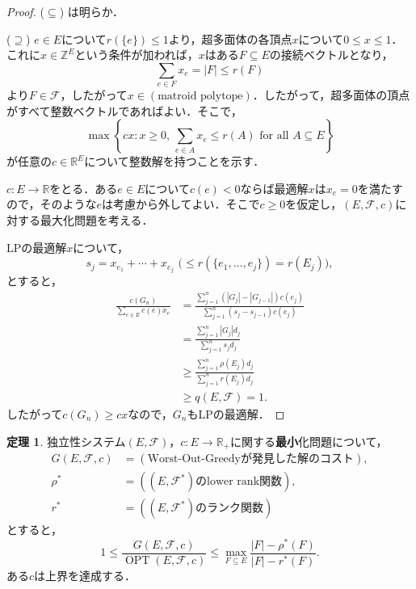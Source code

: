 \documentclass[xelatex,ja=standard,a4paper,14pt,everyparhook=compat]{bxjsarticle}
\newcommand{\bbZ}{\mathbb{Z}}
\newcommand{\bbR}{\mathbb{R}}
\newcommand{\mcF}{\mathcal{F}}
\DeclareMathOperator{\OPT}{OPT}
\theoremstyle{definition}
\newtheorem{theorem}{定理}[section]
\begin{document}
\begin{proof}
    ($\subseteq$) は明らか．

    ($\supseteq$) $e \in E$について$r(\{e\}) \leq 1$より，超多面体の各頂点$x$について$0 \leq x \leq 1$．これに$x \in \bbZ^E$という条件が加われば，$x$はある$F \subseteq E$の接続ベクトルとなり， \begin{equation*}
        \sum_{e \in F} x_e = |F| \leq r(F)
    \end{equation*} より$F \in \mcF$，したがって$x \in (\text{matroid polytope})$．したがって，超多面体の頂点がすべて整数ベクトルであればよい．そこで， \begin{equation*}
        \max \left\{ cx : \text{$x \geq 0$, $\sum_{e \in A} x_e \leq r(A)$ for all $A \subseteq E$} \right\}
    \end{equation*}
    が任意の$c \in \bbR^E$について整数解を持つことを示す．

    $c: E \to \bbR$をとる．ある$e \in E$について$c(e) < 0$ならば最適解$x$は$x_e = 0$を満たすので，そのような$e$は考慮から外してよい．そこで$c \geq 0$を仮定し，$(E,\mcF,c)$に対する最大化問題を考える．

    LPの最適解$x$について， \begin{equation*}
        \text{$s_j = x_{e_1} + \cdots + x_{e_j}$ ($\leq r(\{e_1,\ldots,e_j\}) = r(E_j)$)},
    \end{equation*}
    とすると，
     \begin{align*}
        \frac{c(G_n)}{\sum_{e \in E} c(e) x_e}
        &= \frac{\sum_{j=1}^n (|G_j| - |G_{j-1}|) c(e_j)}{\sum_{j=1}^n (s_j - s_{j-1}) c(e_j)} \\
        &= \frac{\sum_{j=1}^n |G_j| d_j}{\sum_{j=1}^n s_j d_j} \\
        &\geq \frac{\sum_{j=1}^n \rho(E_j) d_j}{\sum_{j=1}^n r(E_j) d_j} \\
        &\geq q(E, \mcF) = 1.
    \end{align*}
    したがって$c(G_n) \geq cx$なので，$G_n$もLPの最適解．
\end{proof}

\begin{theorem}
    独立性システム$(E, \mcF)$，$c: E \to \bbR_+$に関する\textbf{最小}化問題について， \begin{align*}
        G(E,\mcF,c) &= (\text{Worst-Out-Greedyが発見した解のコスト}), \\
        \rho^* &= (\text{$(E,\mcF^*)$のlower rank関数}), \\
        r^* &= (\text{$(E,\mcF^*)$のランク関数})
    \end{align*}
    とすると， \begin{equation*}
        1 \leq \frac{G(E,\mcF,c)}{\OPT(E,\mcF,c)} \leq \max_{F \subseteq E} \frac{|F| - \rho^*(F)}{|F| - r^*(F)}.
    \end{equation*}
    ある$c$は上界を達成する．
\end{theorem}
\end{document}

